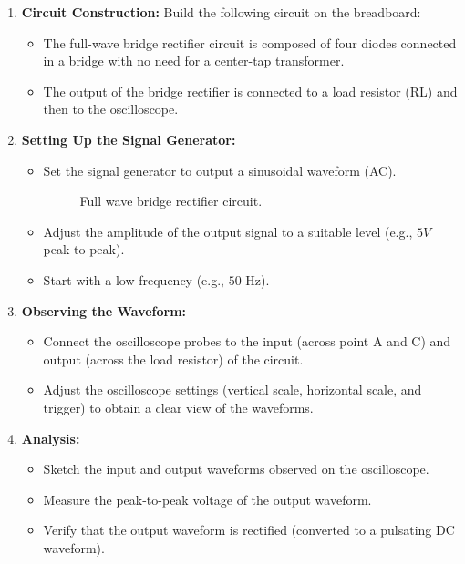 \begin{enumerate}
    \item \textbf{Circuit Construction:} Build the following circuit on the breadboard:

    \begin{itemize}
        \item The full-wave bridge rectifier circuit is composed of four diodes connected in a bridge with no need for a center-tap transformer.
        \item The output of the bridge rectifier is connected to a load resistor (RL) and then to the oscilloscope.
    \end{itemize}

    \item \textbf{Setting Up the Signal Generator:}
    \begin{itemize}
        \item Set the signal generator to output a sinusoidal waveform (AC).

        \begin{figure}[H]
            \centering
            
            \caption{Full wave bridge rectifier circuit.}
            \label{fig:full_wave}
        \end{figure}

        \item Adjust the amplitude of the output signal to a suitable level (e.g., $5V$ peak-to-peak).

        \item Start with a low frequency (e.g., $50$ Hz).
    \end{itemize}

    \item \textbf{Observing the Waveform:}
    \begin{itemize}
        \item Connect the oscilloscope probes to the input (across point A and C) and output (across the load resistor) of the circuit.
        
        \item Adjust the oscilloscope settings (vertical scale, horizontal scale, and trigger) to obtain a clear view of the waveforms.
    \end{itemize}

    \item \textbf{Analysis:}
    \begin{itemize}
        \item Sketch the input and output waveforms observed on the oscilloscope.
        \item Measure the peak-to-peak voltage of the output waveform.
        \item Verify that the output waveform is rectified (converted to a pulsating DC waveform).
    \end{itemize}


\end{enumerate}
